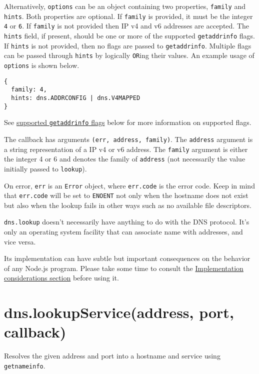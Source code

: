 Alternatively, \texttt{options} can be an object containing two
properties, \texttt{family} and \texttt{hints}. Both properties are
optional. If \texttt{family} is provided, it must be the integer
\texttt{4} or \texttt{6}. If \texttt{family} is not provided then IP v4
and v6 addresses are accepted. The \texttt{hints} field, if present,
should be one or more of the supported \texttt{getaddrinfo} flags. If
\texttt{hints} is not provided, then no flags are passed to
\texttt{getaddrinfo}. Multiple flags can be passed through
\texttt{hints} by logically \texttt{OR}ing their values. An example
usage of \texttt{options} is shown below.

\begin{verbatim}
{
  family: 4,
  hints: dns.ADDRCONFIG | dns.V4MAPPED
}
\end{verbatim}

See \hyperref[dnsux5fsupportedux5fgetaddrinfoux5fflags]{supported
\texttt{getaddrinfo} flags} below for more information on supported
flags.

The callback has arguments \texttt{(err,\ address,\ family)}. The
\texttt{address} argument is a string representation of a IP v4 or v6
address. The \texttt{family} argument is either the integer 4 or 6 and
denotes the family of \texttt{address} (not necessarily the value
initially passed to \texttt{lookup}).

On error, \texttt{err} is an \texttt{Error} object, where
\texttt{err.code} is the error code. Keep in mind that \texttt{err.code}
will be set to \texttt{\textquotesingle{}ENOENT\textquotesingle{}} not
only when the hostname does not exist but also when the lookup fails in
other ways such as no available file descriptors.

\texttt{dns.lookup} doesn't necessarily have anything to do with the DNS
protocol. It's only an operating system facility that can associate name
with addresses, and vice versa.

Its implementation can have subtle but important consequences on the
behavior of any Node.js program. Please take some time to consult the
\hyperref[dnsux5fimplementationux5fconsiderations]{Implementation
considerations section} before using it.

\section{dns.lookupService(address, port,
callback)}\label{dns.lookupserviceaddress-port-callback}

Resolves the given address and port into a hostname and service using
\texttt{getnameinfo}.

